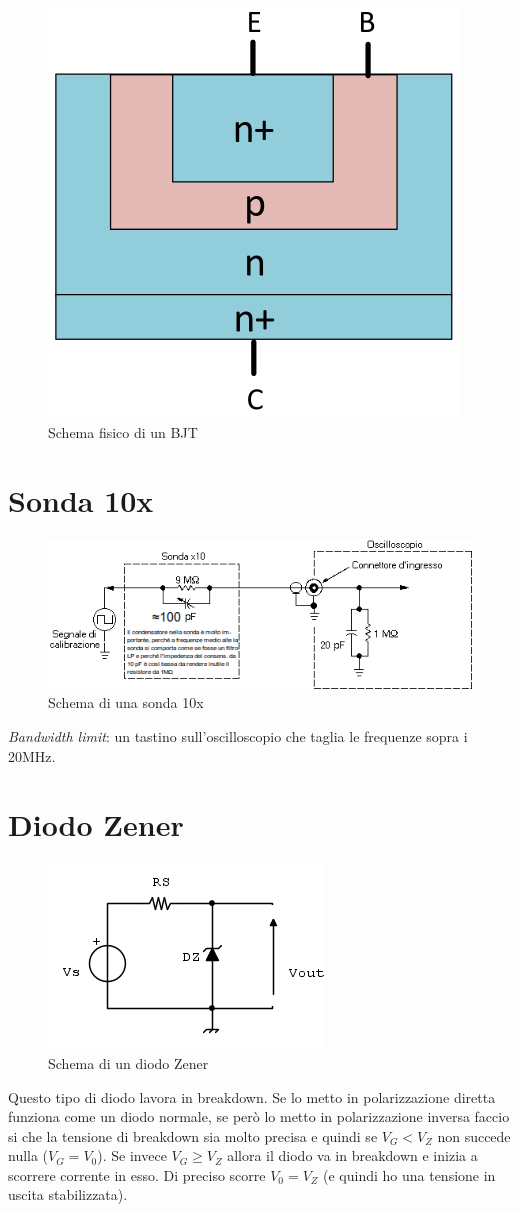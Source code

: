 \documentclass[
]{book}
\begin{document}
\begin{figure}
\centering
\includegraphics[width=0.2\linewidth,height=\textheight,keepaspectratio]{immagini/9.png}
\caption{Schema fisico di un BJT}
\end{figure}

\section{Sonda 10x}\label{sonda-10x}

\begin{figure}
\centering
\includegraphics[width=0.6\linewidth,height=\textheight,keepaspectratio]{immagini/10.png}
\caption{Schema di una sonda 10x}
\end{figure}

\emph{Bandwidth limit}: un tastino sull'oscilloscopio che taglia le
frequenze sopra i 20MHz.

\section{Diodo Zener}\label{diodo-zener}

\begin{figure}
\centering
\includegraphics[width=0.5\linewidth,height=\textheight,keepaspectratio]{immagini/11.png}
\caption{Schema di un diodo Zener}
\end{figure}

Questo tipo di diodo lavora in breakdown. Se lo metto in polarizzazione
diretta funziona come un diodo normale, se però lo metto in
polarizzazione inversa faccio si che la tensione di breakdown sia molto
precisa e quindi se \(V_{G}<V_{Z}\) non succede nulla (\(V_{G}=V_{0}\)).
Se invece \(V_{G}\geq V_{Z}\) allora il diodo va in breakdown e inizia a
scorrere corrente in esso. Di preciso scorre \(V_{0}=V_{Z}\) (e quindi
ho una tensione in uscita stabilizzata).
\end{document}

